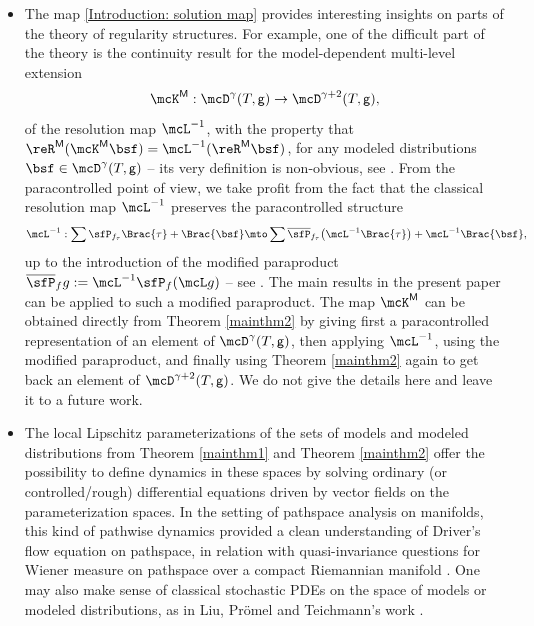 \begin{itemize}
	\item The map \eqref {Introduction: solution map} provides interesting insights on parts of the theory of regularity structures. For example, one of the difficult part of the theory is the continuity result for the model-dependent multi-level extension
\[
\mcK^{\sf M}: \mcD^\gamma(T,{\sf g}) \to \mcD^{\gamma+2}(T,{\sf g}),
\]
of the resolution map $\mcL^{-1}$, with the property that $\reR^{\sf M}(\mcK^{\sf M}\bsf)=\mcL^{-1}(\reR^{\sf M}\bsf)$, for any modeled distributions $\bsf\in\mcD^\gamma(T,{\sf g})$ -- its very definition is non-obvious, see \cite[\S 5]{Hai}. From the paracontrolled
point of view, we take profit from the fact that the classical resolution map $\mcL^{-1}$ preserves the paracontrolled structure
\[
\mcL^{-1}:\sum \sfP_{f_\tau}\Brac{\tau}+\Brac{\bsf}\mto \sum \overline{\sfP}_{f_\tau}\bigl(\mcL^{-1}\Brac{\tau}\bigr) + \mcL^{-1}\Brac{\bsf},
\]
up to the introduction of the modified paraproduct $\overline{\sfP}_fg := \mcL^{-1}\sfP_f(\mcL g)$ -- see \cite{BB16}. The main results in the present paper can be applied to such a modified paraproduct. The map $\mcK^{\sf M}$ can be obtained directly from Theorem \ref{mainthm2} by giving first a paracontrolled representation of an element of $\mcD^\gamma(T,{\sf g})$, then applying $\mcL^{-1}$, using the modified paraproduct, and finally using Theorem \ref{mainthm2} again to get back an element of $\mcD^{\gamma+2}(T,{\sf g})$. We do not give the details here and leave it to a future work.
	
	\item The local Lipschitz parameterizations of the sets of models and modeled distributions from Theorem \ref{mainthm1} and Theorem \ref{mainthm2} offer the possibility to define dynamics in these spaces by solving ordinary (or controlled/rough) differential equations driven by vector fields on the parameterization spaces. In the setting of pathspace analysis on manifolds, this kind of pathwise dynamics provided a clean understanding of Driver's flow equation on pathspace, in relation with quasi-invariance questions for Wiener measure on pathspace over a compact Riemannian manifold \cite{DriverFlow, LyonsQian, BailleulRegularity}. One may also make sense of classical stochastic PDEs on the space of models or modeled distributions, as in Liu, Prömel and Teichmann's work \cite{LPT18}.
\end{itemize}

